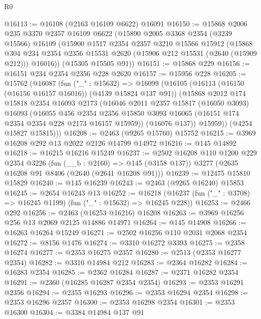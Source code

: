 \begin{lexlean}{R0}
\begin{coremodule}
@16113 := @16108 (@2163 @16109 @6622) @16091
@16150 := @15868
    @2006
    @235
    @3370
    @2357
    @16109
    @6622
    (@15890
      @2005
      @3368
      @2354
      (@3239 @15566)
      @16109
      (@15900
        @1517
        @2354
        @2357
        @3210
        @15566
        @15912
        (@15868
          @304
          @234
          @2354
          @2356
          @15531
          @2620
          (@15906 @212 @15531 (@2640 (@15909 @212)))
          @16016))
      (@15305 @15505 @91))
@16151 := @15868 @229
@16156 := @16151 @234 @2354 @2356 @228 @2620
@16157 := @15956 @228
@16205 := @15762
    (@16087
      (fun ("_" : @15632) =>
      @16099
        (@16105
          (@16113 (@16150 (@16156 @16157 @16016)) (@4139 @15824 @137 @91))
          (@15868
            @2012
            @174
            @15818
            @2354
            @16093
            @2173
            (@16046
              @2011
              @2357
              @15817
              (@16050 @3093)
              @16093
              (@16055
                @456
                @2354
                @2356
                @15850
                @3093
                @16065
                (@16151 @174 @2354 @2354 @228 @2173 @16157 @15959))
              (@16076 @137))
            @15959))
        (@4254 @15827 @15815)))
@16208 := @2463 (@9265 @15760) @15752
@16215 := @3969 @16208 @292 @13 @2022 @2126 @14799 @14972
@16216 := @145 @14892
@16218 := @16215 @16216 @15249
@16237 := @2502
    @16208
    @110
    @1200
    @229
    @2354
    @3226
    (fun (__b : @2160) => @145 (@3158 @137))
    @3277
    (@2635 @16208 @91 @8406 (@2640 (@2641 @16208 @91)))
@16239 := @12475 @15810 @15829
@16240 := @145 @16239
@16243 := @2463 (@9265 @16240) @15853
@16245 := @2654 @16243 @13
@16252 := @16218 (@16237 (fun ("_" : @3708) => @16245 @1199) (fun ("_" : @15632) => @16245 @228))
@16253 := @2466 @292
@16256 := @2463 (@16253 @16216) @16208
@16263 := @3969 @16256 @256 @13 @2069 @2125 @14886 @14971
@16264 := @145 @14908
@16266 := @16263 @16264 @15249
@16271 := @2502 @16256 @110 @2031 @2068 @2354
@16272 := @8156 @1476
@16274 := @3310 @16272 @3393
@16275 := @2358 @16274
@16277 := @2353 @16275 @2357
@16280 := @2513 (@2353 @16277 @2354)
@16282 := @3310 @14984 @212
@16283 := @2364 @16282
@16284 := @16283 @2354
@16285 := @2362 @16284
@16287 := @2371 @16282 @2354
@16291 := @2360 (@16285 @16287 @2354 @2354)
@16293 := @2353 @16291 @2356
@16294 := @2355 @16293
@16296 := @2353 @16294 @2354
@16298 := @2353 @16296 @2357
@16300 := @2353 @16298 @2354
@16301 := @2353 @16300
@16304 := @3384 @14984 @137 @91

\end{coremodule}
\end{lexlean}
